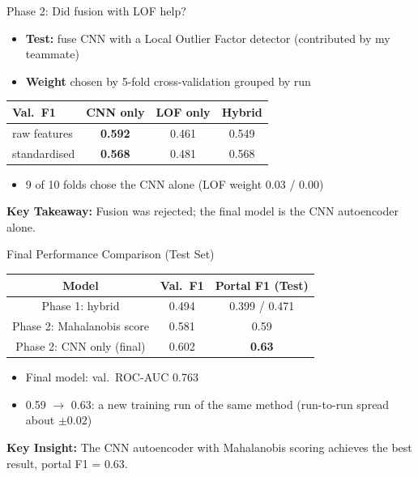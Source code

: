 \documentclass{beamer}
\newcommand{\takeaway}[1]{\par\vspace{0.4em}\noindent\textbf{Key Takeaway:} #1}
\begin{document}
\begin{frame}{Phase 2: Did fusion with LOF help?}
\begin{itemize}
  \item \textbf{Test:} fuse CNN with a Local Outlier Factor detector (contributed by my teammate)
  \item \textbf{Weight} chosen by 5-fold cross-validation grouped by run
\end{itemize}
\begin{center}
\small
\begin{tabular}{|l|c|c|c|}
\hline
\textbf{Val.\ F1} & \textbf{CNN only} & \textbf{LOF only} & \textbf{Hybrid} \\
\hline
raw features & \textbf{0.592} & 0.461 & 0.549 \\
standardised & \textbf{0.568} & 0.481 & 0.568 \\
\hline
\end{tabular}
\end{center}
\begin{itemize}
  \item 9 of 10 folds chose the CNN alone (LOF weight 0.03 / 0.00)
\end{itemize}
\takeaway{Fusion was rejected; the final model is the CNN autoencoder alone.}
\end{frame}

\begin{frame}{Final Performance Comparison (Test Set)}
\begin{center}
\begin{tabular}{|c|c|c|}
\hline
\textbf{Model} & \textbf{Val.\ F1} & \textbf{Portal F1 (Test)} \\
\hline
Phase 1: hybrid & 0.494 & 0.399 / 0.471 \\
Phase 2: Mahalanobis score & 0.581 & 0.59 \\
Phase 2: CNN only (final) & 0.602 & \textbf{0.63} \\
\hline
\end{tabular}
\end{center}
\begin{itemize}
  \item Final model: val.\ ROC-AUC 0.763
  \item 0.59 $\rightarrow$ 0.63: a new training run of the same method (run-to-run spread about $\pm0.02$)
\end{itemize}
\textbf{Key Insight:} The CNN autoencoder with Mahalanobis scoring achieves the best result, portal F1 = 0.63.
\end{frame}
\end{document}
